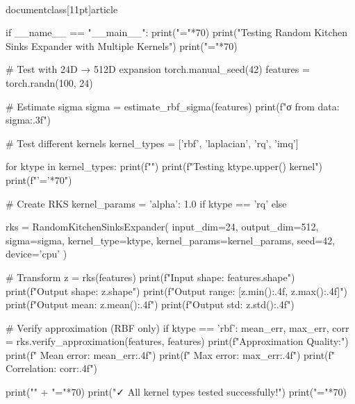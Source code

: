 \\documentclass[11pt]{article}
\begin{document}
\begin{CodeBlock}
if __name__ == "__main__":
    print("="*70)
    print("Testing Random Kitchen Sinks Expander with Multiple Kernels")
    print("="*70)
    
    # Test with 24D → 512D expansion
    torch.manual_seed(42)
    features = torch.randn(100, 24)
    
    # Estimate sigma
    sigma = estimate_rbf_sigma(features)
    print(f"\nEstimated σ from data: {sigma:.3f}")
    
    # Test different kernels
    kernel_types = ['rbf', 'laplacian', 'rq', 'imq']
    
    for ktype in kernel_types:
        print(f"")
        print(f"Testing {ktype.upper()} kernel")
        print(f"{'='*70}")
        
        # Create RKS
        kernel_params = {'alpha': 1.0} if ktype == 'rq' else {}
        
        rks = RandomKitchenSinksExpander(
            input_dim=24,
            output_dim=512,
            sigma=sigma,
            kernel_type=ktype,
            kernel_params=kernel_params,
            seed=42,
            device='cpu'
        )
        
        # Transform
        z = rks(features)
        print(f"Input shape: {features.shape}")
        print(f"Output shape: {z.shape}")
        print(f"Output range: [{z.min():.4f}, {z.max():.4f}]")
        print(f"Output mean: {z.mean():.4f}")
        print(f"Output std: {z.std():.4f}")
        
        # Verify approximation (RBF only)
        if ktype == 'rbf':
            mean_err, max_err, corr = rks.verify_approximation(features, features)
            print(f"\nKernel Approximation Quality:")
            print(f"  Mean error: {mean_err:.4f}")
            print(f"  Max error: {max_err:.4f}")
            print(f"  Correlation: {corr:.4f}")
    
    print("\n" + "="*70)
    print("✓ All kernel types tested successfully!")
    print("="*70)

\end{CodeBlock}
\end{document}
